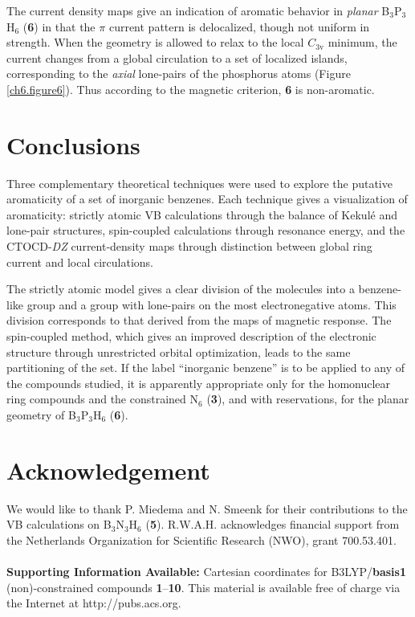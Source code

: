 The current density maps give an indication of aromatic behavior
in \textit{planar} B$_3$P$_3$H$_6$ (\textbf{6}) in that the $\pi$ current pattern is delocalized,
though not uniform in strength. When the geometry is allowed to relax to the local $C_{\mathrm{3v}}$
minimum, the current changes from a global circulation to a
set of localized islands, corresponding to the \textit{axial} lone-pairs of the phosphorus atoms
(Figure \ref{ch6.figure6}). Thus according to the magnetic criterion, \textbf{6} is non-aromatic.

\section{Conclusions}

Three complementary theoretical techniques were used to explore the putative
aromaticity of a set of inorganic benzenes. Each technique gives a visualization
of aromaticity: strictly atomic VB calculations through the balance of Kekul\'e and
lone-pair structures, spin-coupled calculations through resonance energy, and the CTOCD-\textit{DZ}
current-density maps through distinction between global ring current and local circulations.

The strictly atomic model gives a clear division of the molecules into a
benzene-like group and a group with lone-pairs on the most electronegative
atoms. This division corresponds to that derived from the maps of magnetic response. The spin-coupled
method, which gives an improved description of the
electronic structure through unrestricted orbital optimization, leads to the same partitioning of the
set. If the label ``inorganic benzene'' is to be applied to any of the compounds studied, it is apparently
appropriate only for the homonuclear ring compounds and the constrained N$_6$ (\textbf{3}), and with
reservations, for the planar geometry of B$_3$P$_3$H$_6$ (\textbf{6}).

\section*{Acknowledgement}

We would like to thank P. Miedema and N. Smeenk for their contributions to the VB calculations on B$_3$N$_3$H$_6$ (\textbf{5}).
R.W.A.H. acknowledges financial support from the Netherlands Organization for Scientific Research (NWO), grant 700.53.401.
\\
\\
\noindent \textbf{Supporting Information Available:} Cartesian coordinates for B3LYP/\textbf{basis1} (non)-constrained
compounds \textbf{1}--\textbf{10}. This material is available free of charge via the Internet at
http://pubs.acs.org.



